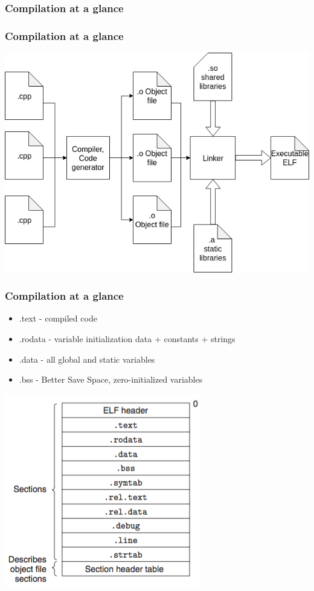 \documentclass{beamer}
\begin{document}
\subsubsection{Compilation at a glance}

\begin{frame}
\frametitle{Compilation at a glance}
	\centering
	\includegraphics[scale=0.35]{CompilationDiagram.png}
\end{frame}

\begin{frame}
\frametitle{Compilation at a glance}
	\begin{itemize}
		\item .text - compiled code
		\item .rodata - variable initialization data + constants + strings
		\item .data - all global and static variables
		\item .bss - Better Save Space, zero-initialized variables
	\end{itemize}

	\centering
	\includegraphics[scale=0.35]{RelocatedObject.png}
\end{frame}
\end{document}
